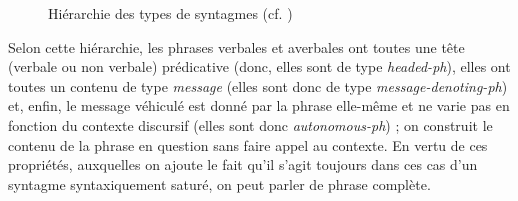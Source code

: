 \begin{figure} 
\caption{Hiérarchie des types de syntagmes (cf. \citealt{Laurens2008})}
\label{ch1:fig2}
\end{figure}

Selon cette hiérarchie, les phrases verbales et averbales ont toutes une tête (verbale ou non verbale) prédicative (donc, elles sont de type \textit{headed-ph}), elles ont toutes un contenu de type \textit{message} (elles sont donc de type \textit{message-denoting-ph}) et, enfin, le message véhiculé est donné par la phrase elle-même et ne varie pas en fonction du contexte discursif (elles sont donc \textit{autonomous-ph}) ; on construit le contenu de la phrase en question sans faire appel au contexte. En vertu de ces propriétés, auxquelles on ajoute le fait qu’il s’agit toujours dans ces cas d’un syntagme syntaxiquement saturé, on peut parler de phrase complète.

